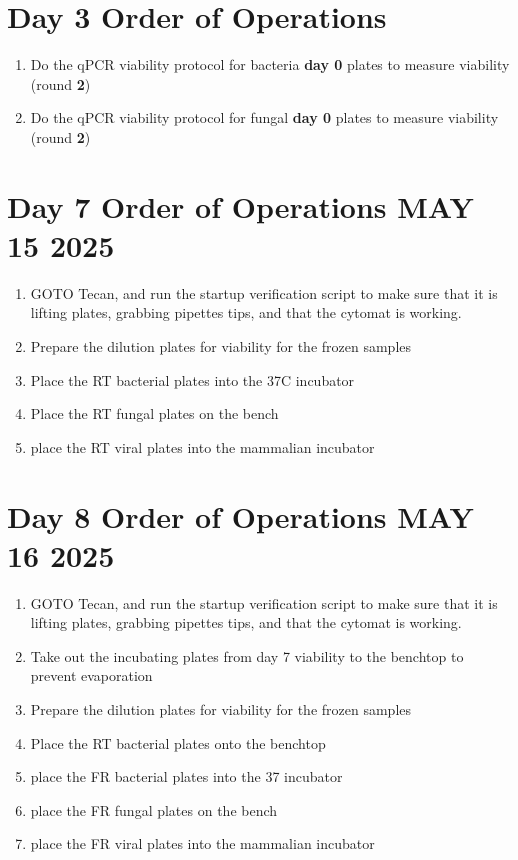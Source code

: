 \documentclass{article}
\begin{document}
\section*{Day 3 Order of Operations} \label{day1instructions}
\begin{enumerate}
    \item Do the qPCR viability protocol for bacteria \textbf{day 0} plates to measure viability (round \textbf{2})
    \item Do the qPCR viability protocol for fungal \textbf{day 0} plates to measure viability (round \textbf{2})
\end{enumerate}

\section*{Day 7 Order of Operations MAY 15 2025} \label{day7instructions}
\begin{enumerate}
    \item GOTO Tecan, and run the startup verification script to make sure that it is lifting plates, grabbing pipettes tips, and that the cytomat is working. 
    \item Prepare the dilution plates for viability for the frozen samples
    \item Place the RT bacterial plates into the 37C incubator
    \item Place the RT fungal plates on the bench
    \item place the RT viral plates into the mammalian incubator
\end{enumerate}

\section*{Day 8 Order of Operations MAY 16 2025} \label{day8instructions}
\begin{enumerate}
    \item GOTO Tecan, and run the startup verification script to make sure that it is lifting plates, grabbing pipettes tips, and that the cytomat is working. 
    \item Take out the incubating plates from day 7 viability to the benchtop to prevent evaporation
    \item Prepare the dilution plates for viability for the frozen samples
    \item Place the RT bacterial plates onto the benchtop
    \item place the FR bacterial plates into the 37 incubator
    \item place the FR fungal plates on the bench
    \item place the FR viral plates into the mammalian incubator
\end{enumerate}
\end{document}
